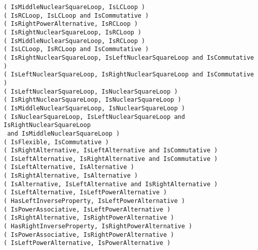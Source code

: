 \documentclass[a4paper,11pt]{report}
\begin{document}
{\texttt{( IsMiddleNuclearSquareLoop, IsLCLoop )} \\
\texttt{( IsRCLoop, IsLCLoop and IsCommutative )} \\
\texttt{( IsRightPowerAlternative, IsRCLoop )} \\
\texttt{( IsRightNuclearSquareLoop, IsRCLoop )} \\
\texttt{( IsMiddleNuclearSquareLoop, IsRCLoop )} \\
\texttt{( IsLCLoop, IsRCLoop and IsCommutative )} \\
\texttt{( IsRightNuclearSquareLoop, IsLeftNuclearSquareLoop and IsCommutative )} \\
\texttt{( IsLeftNuclearSquareLoop, IsRightNuclearSquareLoop and IsCommutative )} \\
\texttt{( IsLeftNuclearSquareLoop, IsNuclearSquareLoop )} \\
\texttt{( IsRightNuclearSquareLoop, IsNuclearSquareLoop )} \\
\texttt{( IsMiddleNuclearSquareLoop, IsNuclearSquareLoop )} \\
\texttt{( IsNuclearSquareLoop, IsLeftNuclearSquareLoop and IsRightNuclearSquareLoop} \\
\texttt{ and IsMiddleNuclearSquareLoop )} \\
\texttt{( IsFlexible, IsCommutative )} \\
\texttt{( IsRightAlternative, IsLeftAlternative and IsCommutative )} \\
\texttt{( IsLeftAlternative, IsRightAlternative and IsCommutative )} \\
\texttt{( IsLeftAlternative, IsAlternative )} \\
\texttt{( IsRightAlternative, IsAlternative )} \\
\texttt{( IsAlternative, IsLeftAlternative and IsRightAlternative )} \\
\texttt{( IsLeftAlternative, IsLeftPowerAlternative )} \\
\texttt{( HasLeftInverseProperty, IsLeftPowerAlternative )} \\
\texttt{( IsPowerAssociative, IsLeftPowerAlternative )} \\
\texttt{( IsRightAlternative, IsRightPowerAlternative )} \\
\texttt{( HasRightInverseProperty, IsRightPowerAlternative )} \\
\texttt{( IsPowerAssociative, IsRightPowerAlternative )} \\
\texttt{( IsLeftPowerAlternative, IsPowerAlternative )} \\
}
\end{document}
